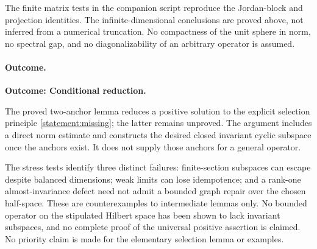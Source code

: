 \documentclass[11pt,a4paper]{article}
\numberwithin{equation}{section}
\begin{document}
The finite matrix tests in the companion script reproduce the Jordan-block
and projection identities. The infinite-dimensional conclusions are proved
above, not inferred from a numerical truncation. No compactness of the unit
sphere in norm, no spectral gap, and no diagonalizability of an arbitrary
operator is assumed.

\paragraph{Outcome.}
\textbf{Outcome: Conditional reduction.}

The proved two-anchor lemma reduces a positive solution to the explicit
selection principle \eqref{statement:missing}; the latter remains unproved.
The argument includes a direct norm estimate and constructs the desired
closed invariant cyclic subspace once the anchors exist. It does not
supply those anchors for a general operator.

The stress tests identify three distinct failures: finite-section subspaces
can escape despite balanced dimensions; weak limits can lose idempotence;
and a rank-one almost-invariance defect need not admit a bounded graph
repair over the chosen half-space. These are counterexamples to intermediate
lemmas only. No bounded operator on the stipulated Hilbert space has been
shown to lack invariant subspaces, and no complete proof of the universal
positive assertion is claimed. No priority claim is made for the elementary
selection lemma or examples.

\par{}
\end{document}

